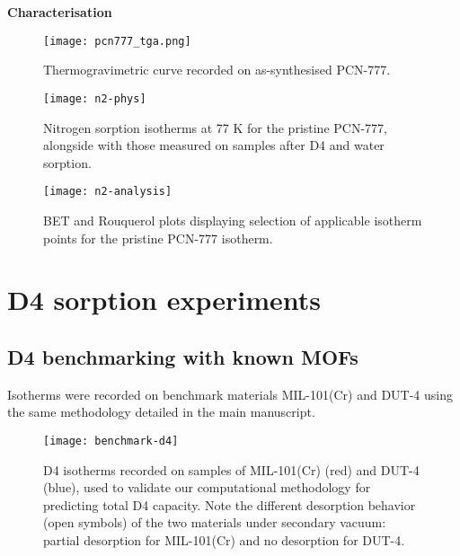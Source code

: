 \pagebreak

\textbf{Characterisation}

\begin{figure}[H]
    \centering
    \texttt{[image: pcn777\_tga.png]}
    \caption{%
        Thermogravimetric curve recorded on as-synthesised PCN-777.
    }\label{fig:tga}
\end{figure}

\begin{figure}[H]
    \centering
    \texttt{[image: n2-phys]}
    \caption{%
        Nitrogen sorption isotherms at 77 K for the pristine
        PCN-777, alongside with those measured on samples after D4 and water
        sorption.
    }\label{fig:n2-phys}
\end{figure}


\begin{figure}[H]
    \centering
    \texttt{[image: n2-analysis]}
    \caption{%
        BET and Rouquerol plots displaying selection of applicable
        isotherm points for the pristine PCN-777 isotherm.
    }\label{fig:n2-analysis}
\end{figure}

\pagebreak

\section{D4 sorption experiments}\label{d4-sorption-experiments}

\subsection{D4 benchmarking with known MOFs}\label{d4-benchmarking-with-known-mofs}

Isotherms were recorded on benchmark materials MIL-101(Cr) and DUT-4 using the
same methodology detailed in the main manuscript.

\begin{figure}[H]
    \centering
    \texttt{[image: benchmark-d4]}
    \caption{%
        D4 isotherms recorded on samples of MIL-101(Cr) (red) and
        DUT-4 (blue), used to validate our computational methodology for
        predicting total D4 capacity. Note the different desorption behavior
        (open symbols) of the two materials under secondary vacuum: partial
        desorption for MIL-101(Cr) and no desorption for DUT-4.
    }\label{fig:d4-benchmark}
\end{figure}

